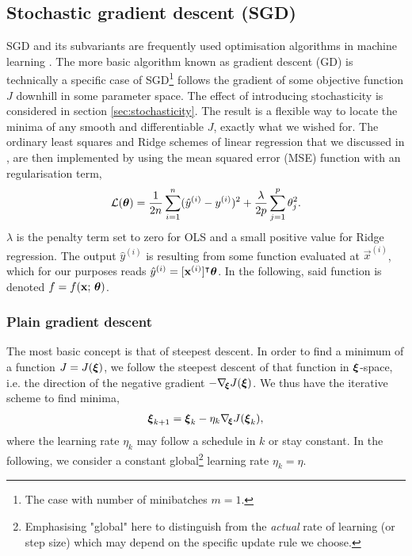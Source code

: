 \subsection{Stochastic gradient descent (SGD)}\label{sec:stochastic_gradient_descent}
    SGD and its subvariants are frequently used optimisation algorithms in machine learning \citep{Goodfellow2016}. The more basic algorithm known as gradient descent (GD) is technically a specific case of SGD\footnote{The case with number of minibatches $m=1$.} follows the gradient of some objective function $J$ downhill in some parameter space. The effect of introducing stochasticity is considered in section \ref{sec:stochasticity}. The result is a flexible way to locate the minima of any smooth and differentiable $J$, exactly what we wished for. The ordinary least squares and Ridge schemes of linear regression that we discussed in \projectOne, are then implemented by using the mean squared error (MSE) function with an \lnorm[2] regularisation term,
    \begin{equation}\label{eq:linear_regression_cost_function}
        \mathcal{L}(\boldsymbol{\theta}) = \frac{1}{2n} \sum_{i=1}^n (\hat{y}^{(i)}-y^{(i)})^2 + \frac{\lambda}{2p} \sum_{j=1}^{p} \theta_j^2. 
    \end{equation}
    $\lambda$ is the penalty term set to zero for OLS and a small positive value for Ridge regression. The output $\hat{y}^{(i)}$ is resulting from some function evaluated at $\vec{x}^{(i)}$, which for our purposes reads $\hat{y}^{(i)} = [\mathbf{x}^{(i)}]^\intercal \boldsymbol{\theta}$. In the following, said function is denoted $f = f(\mathbf{x};\, \boldsymbol{\theta})$.
 
    \subsubsection{Plain gradient descent}\label{sec:plain_gradient_descent}
        The most basic concept is that of steepest descent. In order to find a minimum of a function $J=J(\boldsymbol{\xi})$, we follow the steepest descent of that function in $\boldsymbol{\xi}$-space, i.e. the direction of the negative gradient $-\nabla_{\!\boldsymbol{\xi}} J(\boldsymbol{\xi})$. We thus have the iterative scheme to find minima,
        \begin{align}\label{eq:steepest_descent}
            \boldsymbol{\xi}_{k+1} = \boldsymbol{\xi}_k - \eta_k\nabla_{\!\boldsymbol{\xi}} J(\boldsymbol{\xi}_k),
        \end{align}
        where the learning rate $\eta_k$ may follow a schedule in $k$ or stay constant. In the following, we consider a constant global\footnote{Emphasising "global" here to distinguish from the \textit{actual} rate of learning (or step size) which may depend on the specific update rule we choose.} learning rate $\eta_k=\eta$.


